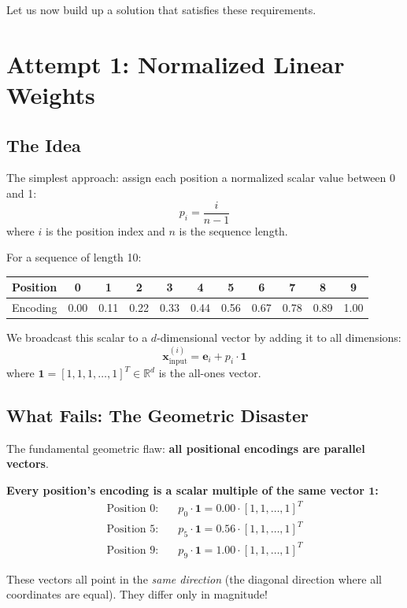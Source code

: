 \documentclass{article}
\begin{document}
Let us now build up a solution that satisfies these requirements.

\section{Attempt 1: Normalized Linear Weights}

\subsection{The Idea}

The simplest approach: assign each position a normalized scalar value between 0 and 1:
\[
p_i = \frac{i}{n-1}
\]
where $i$ is the position index and $n$ is the sequence length.

For a sequence of length 10:
\begin{center}
\begin{tabular}{c|cccccccccc}
Position & 0 & 1 & 2 & 3 & 4 & 5 & 6 & 7 & 8 & 9 \\
\hline
Encoding & 0.00 & 0.11 & 0.22 & 0.33 & 0.44 & 0.56 & 0.67 & 0.78 & 0.89 & 1.00 \\
\end{tabular}
\end{center}

We broadcast this scalar to a $d$-dimensional vector by adding it to all dimensions:
\[
\mathbf{x}_{\text{input}}^{(i)} = \mathbf{e}_i + p_i \cdot \mathbf{1}
\]
where $\mathbf{1} = [1, 1, 1, \ldots, 1]^T \in \mathbb{R}^d$ is the all-ones vector.

\subsection{What Fails: The Geometric Disaster}

\begin{tcolorbox}[colback=red!5!white, colframe=red!75!black, title=Critical Problem: All Positions Point in the Same Direction!]
The fundamental geometric flaw: \textbf{all positional encodings are parallel vectors}.

\textbf{Every position's encoding is a scalar multiple of the same vector $\mathbf{1}$:}
\begin{align}
\text{Position 0:} \quad &p_0 \cdot \mathbf{1} = 0.00 \cdot [1, 1, \ldots, 1]^T \\
\text{Position 5:} \quad &p_5 \cdot \mathbf{1} = 0.56 \cdot [1, 1, \ldots, 1]^T \\
\text{Position 9:} \quad &p_9 \cdot \mathbf{1} = 1.00 \cdot [1, 1, \ldots, 1]^T
\end{align}

These vectors all point in the \emph{same direction} (the diagonal direction where all coordinates are equal). They differ only in magnitude!
\end{tcolorbox}
\end{document}
